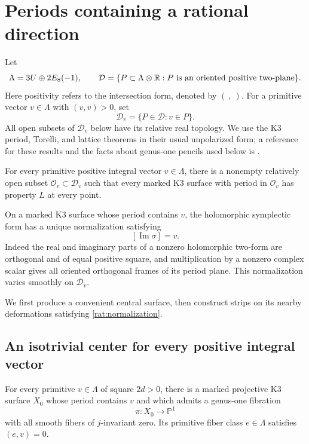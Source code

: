 \section{Periods containing a rational direction}
\label{rat:section}

Let
\[
 \Lambda=3U\oplus 2E_8(-1),\qquad
 \mathcal D=\{P\subset\Lambda\otimes\mathbb R:
       P\text{ is an oriented positive two-plane}\}.
\]
Here positivity refers to the intersection form, denoted by $(\ ,\ )$.
For a primitive vector $v\in\Lambda$ with $(v,v)>0$, set
\[
 \mathcal D_v=\{P\in\mathcal D:v\in P\}.
\]
All open subsets of $\mathcal D_v$ below have its relative real topology.
We use the K3 period, Torelli, and lattice theorems in their usual
unpolarized form; a reference for these results and the facts about
genus-one pencils used below is
\cite[Chapters~2, 6--8, and~11]{Huybrechts}.

\begin{theorem}\label{rat:open}
For every primitive positive integral vector $v\in\Lambda$, there is a
nonempty relatively open subset $\mathcal O_v\subset\mathcal D_v$ such
that every marked K3 surface with period in $\mathcal O_v$ has property
$L$ at every point.
\end{theorem}

On a marked K3 surface whose period contains $v$, the holomorphic
symplectic form has a unique normalization satisfying
\begin{equation}\label{rat:normalization}
 [\operatorname{Im}\sigma]=v.
\end{equation}
Indeed the real and imaginary parts of a nonzero holomorphic two-form
are orthogonal and of equal positive square, and multiplication by a
nonzero complex scalar gives all oriented orthogonal frames of its
period plane. This normalization varies smoothly on $\mathcal D_v$.

We first produce a convenient central surface, then construct strips
on its nearby deformations satisfying \eqref{rat:normalization}.

\subsection{An isotrivial center for every positive integral vector}

\begin{lemma}\label{rat:center}
For every primitive $v\in\Lambda$ of square $2d>0$, there is a marked
projective K3 surface $X_0$ whose period contains $v$ and which admits
a genus-one fibration
\[
 \pi:X_0\longrightarrow\mathbb P^1
\]
with all smooth fibers of $j$-invariant zero. Its primitive fiber class
$e\in\Lambda$ satisfies $(e,v)=0$.
\end{lemma}

